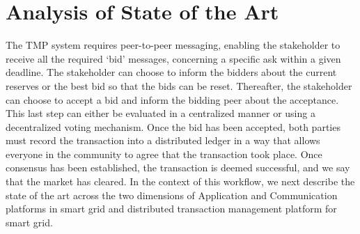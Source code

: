 \documentclass[sigplan]{acmart}
\newcommand{\Abhishek}[1]{\todo[color=yellow!50, linecolor=black!50]{\textbf{Abhishek}: #1}}
\newcommand{\Karla}[1]{\todo[color=green!50, linecolor=black!50]{\textbf{Karla}: #1}}
\begin{document}






\section{Analysis of State of the Art}
The TMP system requires peer-to-peer messaging, enabling the stakeholder to receive all the required `bid' messages, concerning a specific ask within a given deadline. The stakeholder can choose to inform the bidders about the current reserves or the best bid so that the bids can be reset. Thereafter, the stakeholder can choose to accept a bid and inform the bidding peer about the acceptance.  This last step can either be evaluated in a centralized manner or using a decentralized voting mechanism. Once the bid has been accepted, both parties must record the transaction into a distributed ledger in a way that allows everyone in the community to agree that the transaction took place. Once  consensus has been established, the transaction is deemed successful, and we  say that the market has cleared. In the context of this workflow, we next describe the state of the art across the two dimensions of Application and Communication platforms in smart grid and distributed transaction management platform for smart grid.
\end{document}

